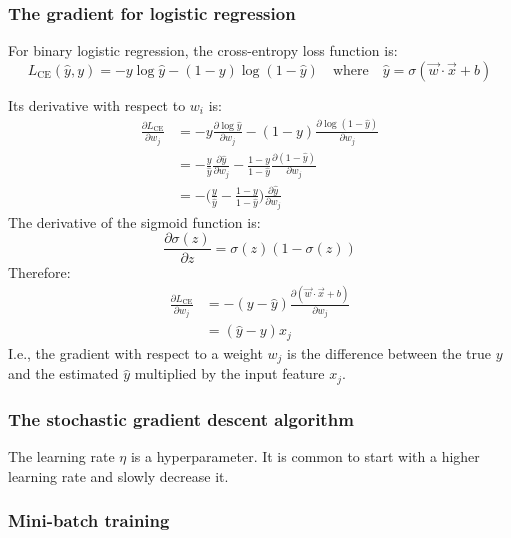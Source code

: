 \subsubsection{The gradient for logistic regression}

For binary logistic regression, the cross-entropy loss function is:
\begin{equation}
  \label{eqnBinaryCrossEntropy}
  L_{\text{CE}}(\hat{y}, y) = - y \log \hat{y} - (1 - y) \log (1 - \hat{y})
  \quad \text{where} \quad
  \hat{y} = \sigma(\vec{w} \cdot \vec{x} + b)
\end{equation}

Its derivative with respect to $w_i$ is:
\begin{align}
  \frac{\partial L_{\text{CE}}}{\partial w_j}
   & = - y \frac{\partial \log \hat{y}}{\partial w_j} - (1 - y) \frac{\partial \log (1 - \hat{y})}{\partial w_j}                         \\
   & = - \frac{y}{\hat{y}} \frac{\partial \hat{y}}{\partial w_j} - \frac{1 - y}{1 - \hat{y}} \frac{\partial (1 - \hat{y})}{\partial w_j} \\
   & = - \biggl( \frac{y}{\hat{y}} - \frac{1 - y}{1 - \hat{y}} \biggr) \frac{\partial \hat{y}}{\partial w_j}
\end{align}
The derivative of the sigmoid function is:
\begin{equation}
  \label{eqnSigmoidDerivative}
  \frac{\partial \sigma(z)}{\partial z} = \sigma(z) (1 - \sigma(z))
\end{equation}
Therefore:
\begin{align}
  \frac{\partial L_{\text{CE}}}{\partial w_j}
   & =  - (y - \hat{y}) \frac{\partial (\vec{w} \cdot \vec{x} + b)}{\partial w_j} \\
   & = (\hat{y} - y) x_j
\end{align}
I.e., the gradient with respect to a weight $w_j$ is the difference between the true $y$ and the estimated $\hat{y}$ multiplied by the input feature $x_j$.

\subsubsection{The stochastic gradient descent algorithm}

The learning rate $\eta$ is a hyperparameter.
It is common to start with a higher learning rate and slowly decrease it.

\setcounter{subsubsection}{3}
\subsubsection{Mini-batch training}